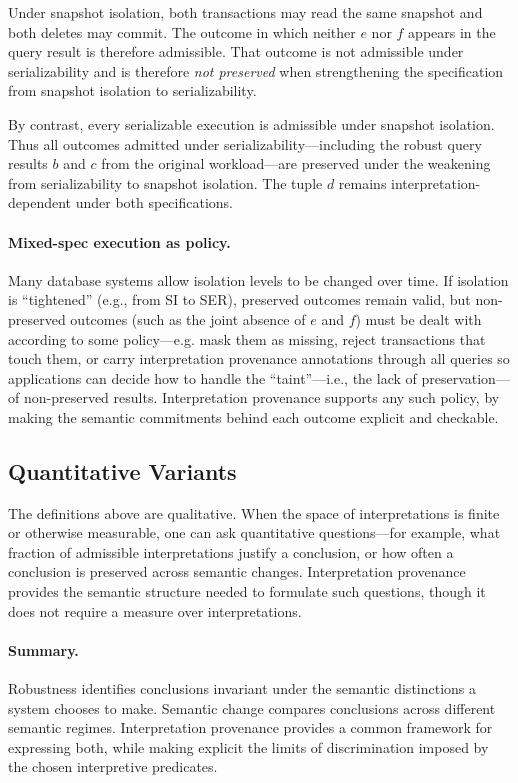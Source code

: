 \documentclass[acmsmall,nonacm]{acmart}
\theoremstyle{remark}
\numberwithin{definition}{section}
\numberwithin{theorem}{section}
\numberwithin{lemma}{section}
\numberwithin{corollary}{section}
\numberwithin{remark}{section}
\numberwithin{example}{section}
\numberwithin{observation}{section}
\numberwithin{assumption}{section}
\begin{document}
Under snapshot isolation, both transactions may read the same snapshot and both
deletes may commit.
The outcome in which neither $e$ nor $f$ appears in the query result is therefore
admissible.
That outcome is not admissible under serializability and is therefore
\emph{not preserved} when strengthening the specification from snapshot isolation
to serializability.

By contrast, every serializable execution is admissible under snapshot isolation.
Thus all outcomes admitted under serializability—including the robust query
results $b$ and $c$ from the original workload—are preserved under the weakening
from serializability to snapshot isolation.
The tuple $d$ remains interpretation-dependent under both specifications.

\paragraph{Mixed-spec execution as policy.}
Many database systems allow isolation levels to be changed over time.
If isolation is ``tightened'' (e.g., from SI to SER), preserved outcomes remain valid, but
non-preserved outcomes (such as the joint absence of $e$ and $f$) must be dealt with according
to some policy---e.g. mask them as missing, reject transactions that touch them, or
carry interpretation provenance annotations through all queries so applications can decide how
to handle the ``taint''—i.e., the lack of preservation—of non-preserved results.
Interpretation provenance supports any such policy, by making the semantic commitments
behind each outcome explicit and checkable.

\subsection{Quantitative Variants}

The definitions above are qualitative.
When the space of interpretations is finite or otherwise measurable, one can ask
quantitative questions—for example, what fraction of admissible interpretations
justify a conclusion, or how often a conclusion is preserved across semantic
changes.
Interpretation provenance provides the semantic structure needed to formulate such
questions, though it does not require a measure over interpretations.

\paragraph{Summary.}
Robustness identifies conclusions invariant under the semantic distinctions a
system chooses to make.
Semantic change compares conclusions across different semantic regimes.
Interpretation provenance provides a common framework for expressing both, while
making explicit the limits of discrimination imposed by the chosen interpretive
predicates.
\end{document}
